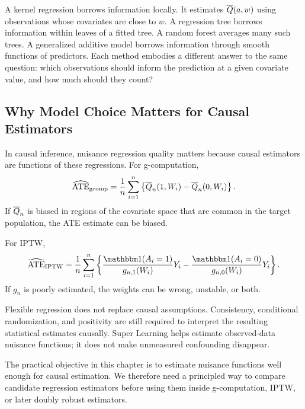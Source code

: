 A kernel regression borrows information locally. It estimates $\overline{Q}(a,w)$ using
observations whose covariates are close to $w$. A regression tree borrows information
within leaves of a fitted tree. A random forest averages many such trees. A generalized
additive model borrows information through smooth functions of predictors. Each
method embodies a different answer to the same question: which observations should
inform the prediction at a given covariate value, and how much should they count?

\subsection{Why Model Choice Matters for Causal Estimators}

In causal inference, nuisance regression quality matters because causal estimators are
functions of these regressions. For g-computation,
\[
\widehat{\operatorname{ATE}}_{\mathrm{gcomp}}
=
\frac{1}{n}\sum_{i=1}^n
\left\{\overline{Q}_n(1,W_i)-\overline{Q}_n(0,W_i)\right\}.
\]
If $\overline{Q}_n$ is biased in regions of the covariate space that are common in the target
population, the ATE estimate can be biased.

For IPTW,
\[
\widehat{\ATE}_{\IPTW}
=
\frac{1}{n}\sum_{i=1}^n
\left\{
\frac{\ind(A_i=1)}{g_{n,1}(W_i)}Y_i
-
\frac{\ind(A_i=0)}{g_{n,0}(W_i)}Y_i
\right\}.
\]
If $g_n$ is poorly estimated, the weights can be wrong, unstable, or both.

\begin{assumptionbox}
Flexible regression does not replace causal assumptions. Consistency,
conditional randomization, and positivity are still required to interpret the resulting
statistical estimates causally. Super Learning helps estimate observed-data nuisance
functions; it does not make unmeasured confounding disappear.
\end{assumptionbox}

\begin{estimationbox}
The practical objective in this chapter is to estimate nuisance functions well enough
for causal estimation. We therefore need a principled way to compare candidate
regression estimators before using them inside g-computation, IPTW, or later doubly
robust estimators.
\end{estimationbox}
